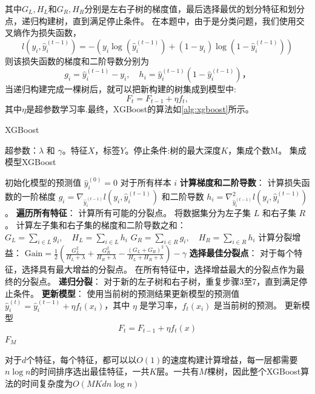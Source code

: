 其中$G_L,H_L$和$G_R,H_R$分别是左右子树的梯度值，最后选择最优的划分特征和划分点，递归构建树，直到满足停止条件。
在本题中，由于是分类问题，我们使用交叉熵作为损失函数，
\begin{equation}
	l(y_i,\hat{y}_i^{(t-1)})=-\left(y_i\log(\hat{y}_i^{(t-1)})+(1-y_i)\log(1-\hat{y}_i^{(t-1)})\right)
\end{equation}
则该损失函数的梯度和二阶导数分别为
\begin{equation}
	g_i=\hat{y}_i^{(t-1)}-y_i ,\quad h_i=\hat{y}_i^{(t-1)}(1-\hat{y}_i^{(t-1)})，
\end{equation}
当递归构建完成一棵树后，就可以把新构建的树集成到模型中:
\begin{equation}
	F_t=F_{t-1}+\eta f_t,
\end{equation}
其中$\eta$是超参数学习率.最终，XGBoost的算法如\autoref{alg:xgboost}所示。
\begin{breakablealgorithm}
	\caption{XGBoost}
	\label{alg:xgboost}
	\begin{algorithmic}[1]
		\REQUIRE 超参数：$\lambda$ 和 $\gamma$。特征$X$，标签$Y$。停止条件:树的最大深度$K$，集成个数M。
		\ENSURE 集成模型XGBoost

		\STATE 初始化模型的预测值 $\hat{y}_i^{(0)} = 0$ 对于所有样本 $i$
		    \STATE \textbf{计算梯度和二阶导数}：
		        \STATE 计算损失函数的一阶梯度 $g_i = \nabla_{\hat{y}_i^{(t-1)}} l(y_i, \hat{y}_i^{(t-1)})$ 和二阶导数 $h_i = \nabla_{\hat{y}_i^{(t-1)}}^2 l(y_i, \hat{y}_i^{(t-1)})$。
		    \ENDFOR
		    \STATE \textbf{遍历所有特征}：
		        \STATE 计算所有可能的分裂点。
		            \STATE 将数据集分为左子集 $L$ 和右子集 $R$。
		            \STATE 计算左子集和右子集的梯度和二阶导数之和：
		            \STATE $G_L = \sum_{i \in L} g_i, \quad H_L = \sum_{i \in L} h_i$
		            \STATE $G_R = \sum_{i \in R} g_i, \quad H_R = \sum_{i \in R} h_i$
		            \STATE 计算分裂增益：
		            \STATE $\text{Gain} = \frac{1}{2}\left(\frac{G_L^2}{H_L + \lambda} + \frac{G_R^2}{H_R + \lambda} - \frac{(G_L + G_R)^2}{H_L + H_R + \lambda}\right) - \gamma$
		        \ENDFOR
		    \ENDFOR
		    \STATE \textbf{选择最佳分裂点}：
		    \STATE 对于每个特征，选择具有最大增益的分裂点。
		    \STATE 在所有特征中，选择增益最大的分裂点作为最终的分裂点。
		    \STATE \textbf{递归分裂}：
		    \STATE 对于新的左子树和右子树，重复步骤3至7，直到满足停止条件。
		    \STATE \textbf{更新模型}：
		    \STATE 使用当前树的预测结果更新模型的预测值 $\hat{y}_i^{(t)} = \hat{y}_i^{(t-1)} + \eta f_t(x_i)$，其中 $\eta$ 是学习率，$f_t(x_i)$ 是当前树的预测。
			\STATE 更新模型
		     \[
			 F_t=F_{t-1}+\eta f_t(x)
			 \]
		\ENDFOR
		\RETURN $F_M$
	\end{algorithmic}
\end{breakablealgorithm}
\par
对于$d$个特征，每个特征，都可以以$O(1)$的速度构建计算增益，每一层都需要$n\log n$的时间排序选出最佳特征，一共$K$层。一共有$M$棵树，因此整个XGBoost算法的时间复杂度为$O(MKdn\log{n})$
\vspace*{1cm}
